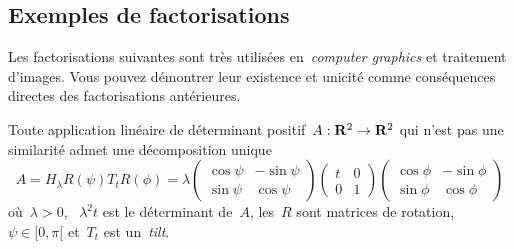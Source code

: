 \subsection{Exemples de factorisations}

Les factorisations suivantes sont très utilisées en~\emph{computer graphics}
et traitement d'images.  Vous pouvez démontrer leur existence et unicité
comme conséquences directes des factorisations antérieures.

\begin{proposition}
	Toute application linéaire de déterminant positif~$A:\mathbf{R}^2\to\mathbf{R}^2$ qui n'est
	pas une similarité admet une décomposition unique
	\[
		A = H_\lambda R(\psi)T_tR(\phi)
		= \lambda
		\begin{pmatrix}\cos\psi & -\sin\psi\\\sin\psi & \cos\psi\end{pmatrix}
		\begin{pmatrix}t & 0 \\0 & 1\end{pmatrix}
		\begin{pmatrix}\cos\phi & -\sin\phi\\\sin\phi & \cos\phi\end{pmatrix}
	\]
	où~$\lambda>0$, ~$\lambda^2t$ est le déterminant de~$A$, les~$R$ sont
	matrices de rotation,~$\psi\in[0,\pi[$ et~$T_t$ est un~\emph{tilt}.
\end{proposition}
